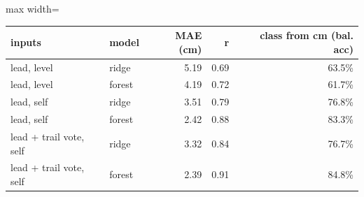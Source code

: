 \begin{adjustbox}{max width=\textwidth}
{\footnotesize
\begin{tabular}{llrrr}
\toprule
\textbf{inputs} & \textbf{model} & \textbf{MAE (cm)} & \textbf{r} & \textbf{class from cm (bal. acc)} \\
\midrule
lead, level & ridge & 5.19 & 0.69 & 63.5\% \\
lead, level & forest & 4.19 & 0.72 & 61.7\% \\
lead, self & ridge & 3.51 & 0.79 & 76.8\% \\
lead, self & forest & 2.42 & 0.88 & 83.3\% \\
lead + trail vote, self & ridge & 3.32 & 0.84 & 76.7\% \\
lead + trail vote, self & forest & 2.39 & 0.91 & 84.8\% \\
\bottomrule
\end{tabular}
}
\end{adjustbox}
